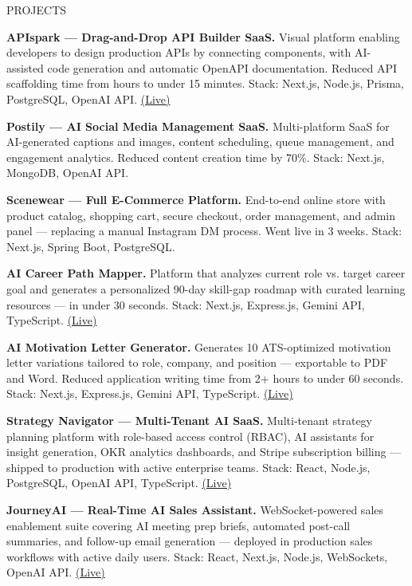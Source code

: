 \documentclass{resume}
\begin{document}
\begin{rSection}{PROJECTS}
\vspace{-1.25em}

\item \textbf{APIspark — Drag-and-Drop API Builder SaaS.} {Visual platform enabling developers to design production APIs by connecting components, with AI-assisted code generation and automatic OpenAPI documentation. Reduced API scaffolding time from hours to under 15 minutes. Stack: Next.js, Node.js, Prisma, PostgreSQL, OpenAI API. \href{https://apisparkdev.vercel.app/}{(Live)}}

\item \textbf{Postily — AI Social Media Management SaaS.} {Multi-platform SaaS for AI-generated captions and images, content scheduling, queue management, and engagement analytics. Reduced content creation time by 70\%. Stack: Next.js, MongoDB, OpenAI API.}

\item \textbf{Scenewear — Full E-Commerce Platform.} {End-to-end online store with product catalog, shopping cart, secure checkout, order management, and admin panel — replacing a manual Instagram DM process. Went live in 3 weeks. Stack: Next.js, Spring Boot, PostgreSQL.}

\item \textbf{AI Career Path Mapper.} {Platform that analyzes current role vs. target career goal and generates a personalized 90-day skill-gap roadmap with curated learning resources — in under 30 seconds. Stack: Next.js, Express.js, Gemini API, TypeScript. \href{https://ai-path-carrer-generator.vercel.app/}{(Live)}}

\item \textbf{AI Motivation Letter Generator.} {Generates 10 ATS-optimized motivation letter variations tailored to role, company, and position — exportable to PDF and Word. Reduced application writing time from 2+ hours to under 60 seconds. Stack: Next.js, Express.js, Gemini API, TypeScript. \href{https://motivation-letter-ai.vercel.app/}{(Live)}}

\item \textbf{Strategy Navigator — Multi-Tenant AI SaaS.} {Multi-tenant strategy planning platform with role-based access control (RBAC), AI assistants for insight generation, OKR analytics dashboards, and Stripe subscription billing — shipped to production with active enterprise teams. Stack: React, Node.js, PostgreSQL, OpenAI API, TypeScript. \href{https://strategynavigator.ai/}{(Live)}}

\item \textbf{JourneyAI — Real-Time AI Sales Assistant.} {WebSocket-powered sales enablement suite covering AI meeting prep briefs, automated post-call summaries, and follow-up email generation — deployed in production sales workflows with active daily users. Stack: React, Next.js, Node.js, WebSockets, OpenAI API. \href{https://meetjourney.ai/}{(Live)}}

\end{rSection}
\end{document}
